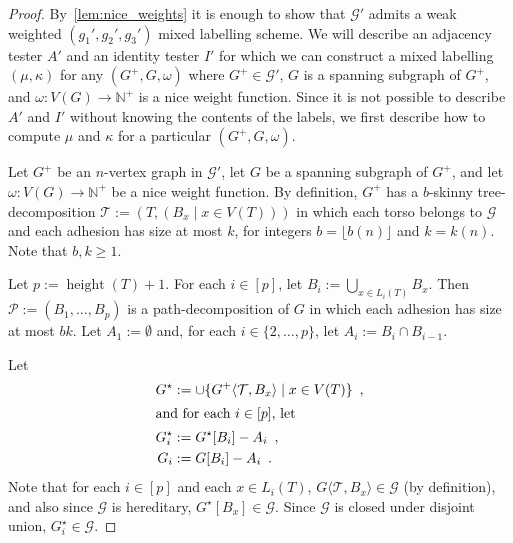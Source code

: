 \documentclass[twoside,leqno]{article}
\newcommand{\N}{\mathbb{N}}
\renewcommand{\geq}{\geqslant}
\newcommand{\torso}[2]{{#1}\langle{#2}\rangle}
\DeclareMathOperator{\height}{height}
\DeclarePairedDelimiter{\set}{\{}{\}}
\begin{document}
\begin{proof}
  By~\cref{lem:nice_weights} it is enough to show that $\mathcal{G}'$ admits a weak weighted $(g_1',g_2',g_3')$ mixed labelling scheme. We will describe an adjacency tester $A'$ and an identity tester $I'$ for which we can construct a mixed labelling $(\mu,\kappa)$ for any $(G^+,G,\omega)$ where $G^+\in\mathcal{G}'$, $G$ is a spanning subgraph of $G^+$, and $\omega:V(G)\to\N^+$ is a nice weight function.
  Since it is not possible to describe $A'$ and $I'$ without knowing the contents of the labels, we first describe how to compute $\mu$ and $\kappa$ for a particular $(G^+,G,\omega)$.

  Let $G^+$ be an $n$-vertex graph in $\mathcal{G}'$, let $G$ be a spanning subgraph of $G^+$, and let $\omega:V(G)\to\N^+$ be a nice weight function.  By definition, $G^+$ has a $b$-skinny tree-decomposition $\mathcal{T}:=(T,(B_x\mid x\in V(T)))$ in which each torso belongs to $\mathcal{G}$ and each adhesion has size at most $k$, for integers $b =\lfloor b(n)\rfloor$ and $k = k(n)$. Note that $b,k\geq1$.

  Let $p:=\height(T)+1$.
  For each $i\in[p]$, let $B_i:=\bigcup_{x\in L_i(T)} B_x$.  Then $\mathcal{P}:=(B_1,\ldots,B_p)$ is a path-decomposition of $G$ in which each adhesion has size at most $bk$.
  Let $A_1:=\emptyset$ and, for each $i\in\{2,\ldots,p\}$, let $A_i:=B_i\cap B_{i-1}$.

  Let
  \begin{align*}
    G^\star
     & := \cup\set{\torso{G^+}{\mathcal{T},B_x}\mid x\in V(T)}\enspace, \\
    \intertext{and for each $i\in[p]$, let }
    G^\star_i
     & := G^\star[B_i]-A_i\enspace,                                     \\
    G_i
     & := G[B_i]-A_i\enspace.
  \end{align*}
  Note that for each $i\in[p]$ and each $x\in L_i(T)$, $\torso{G}{\mathcal{T},B_x}\in\mathcal{G}$
  (by definition), and also since $\mathcal{G}$ is hereditary, $G^\star[B_x]\in\mathcal{G}$.  Since $\mathcal{G}$ is closed under disjoint union, $G^\star_i\in\mathcal{G}$.


\end{proof}
\end{document}

